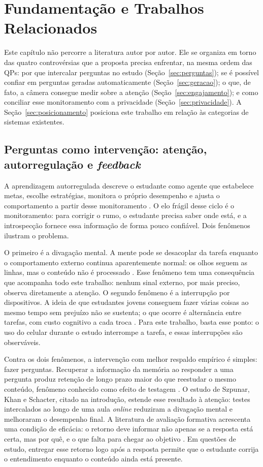 \documentclass[portuguese,oneside]{tcc}
\newcommand{\estr}[1]{\emph{#1}}
\begin{document}
\chapter{\label{chap:fund}Fundamentação e Trabalhos Relacionados}

Este capítulo não percorre a literatura autor por autor. Ele se organiza em torno das quatro controvérsias que a proposta precisa enfrentar, na mesma ordem das QPs: por que intercalar perguntas no estudo (Seção~\ref{sec:perguntas}); se é possível confiar em perguntas geradas automaticamente (Seção~\ref{sec:geracao}); o que, de fato, a câmera consegue medir sobre a atenção (Seção~\ref{sec:engajamento}); e como conciliar esse monitoramento com a privacidade (Seção~\ref{sec:privacidade}). A Seção~\ref{sec:posicionamento} posiciona este trabalho em relação às categorias de sistemas existentes.

\section{\label{sec:perguntas}Perguntas como intervenção: atenção, autorregulação e \estr{feedback}}

A aprendizagem autorregulada descreve o estudante como agente que estabelece metas, escolhe estratégias, monitora o próprio desempenho e ajusta o comportamento a partir desse monitoramento \cite{Zim02}. O elo frágil desse ciclo é o monitoramento: para corrigir o rumo, o estudante precisa saber onde está, e a introspecção fornece essa informação de forma pouco confiável. Dois fenômenos ilustram o problema.

O primeiro é a divagação mental. A mente pode se desacoplar da tarefa enquanto o comportamento externo continua aparentemente normal: os olhos seguem as linhas, mas o conteúdo não é processado \cite{SS06}. Esse fenômeno tem uma consequência que acompanha todo este trabalho: nenhum sinal externo, por mais preciso, observa diretamente a atenção. O segundo fenômeno é a interrupção por dispositivos. A ideia de que estudantes jovens conseguem fazer várias coisas ao mesmo tempo sem prejuízo não se sustenta; o que ocorre é alternância entre tarefas, com custo cognitivo a cada troca \cite{KDB17}. Para este trabalho, basta esse ponto: o uso do celular durante o estudo interrompe a tarefa, e essas interrupções são observáveis.

Contra os dois fenômenos, a intervenção com melhor respaldo empírico é simples: fazer perguntas. Recuperar a informação da memória ao responder a uma pergunta produz retenção de longo prazo maior do que reestudar o mesmo conteúdo, fenômeno conhecido como efeito de testagem \cite{RK06}. O estudo de Szpunar, Khan e Schacter, citado na introdução, estende esse resultado à atenção: testes intercalados ao longo de uma aula \estr{online} reduziram a divagação mental e melhoraram o desempenho final. A literatura de avaliação formativa acrescenta uma condição de eficácia: o retorno deve informar não apenas se a resposta está certa, mas por quê, e o que falta para chegar ao objetivo \cite{BW98}. Em questões de estudo, entregar esse retorno logo após a resposta permite que o estudante corrija o entendimento enquanto o conteúdo ainda está presente.
\end{document}
